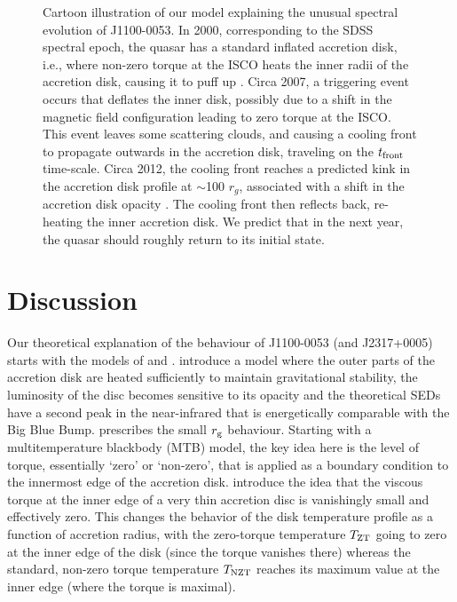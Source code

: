 \documentclass{nature}
\begin{document}
\begin{figure}
{    Cartoon illustration of our model explaining the unusual spectral evolution of J1100-0053. In 2000, corresponding to the SDSS spectral epoch, the quasar has a standard inflated accretion disk, i.e., where non-zero torque at the ISCO heats the inner radii of the accretion disk, causing it to puff up \citep[e.g.,][]{Zimmerman2005}. Circa 2007, a triggering event occurs that deflates the inner disk, possibly due to a shift in the magnetic field configuration leading to zero torque at the ISCO.  This event leaves some scattering clouds, and causing a cooling front to propagate outwards in the accretion disk, traveling on the $t_{\rm front}$ time-scale. Circa 2012, the cooling front reaches a predicted kink in the accretion disk profile at $\sim$100 $r_{g}$, associated with a shift in the accretion disk opacity \citep[e.g., Figure 2 of ][]{Sirko_Goodman2003}.  The cooling front then reflects back, re-heating the inner accretion disk. We predict that in the next year, the quasar should roughly return to its initial state.}
  \label{fig:J110057_diskmodel}
\end{figure}

\section{Discussion} 
Our theoretical explanation of the behaviour of J1100-0053 (and
J2317+0005) starts with the models of \cite{Sirko_Goodman2003} and
\cite{Zimmerman2005}. \cite{Sirko_Goodman2003} introduce a model where
the outer parts of the accretion disk are heated sufficiently to
maintain gravitational stability, the luminosity of the disc becomes
sensitive to its opacity and the theoretical SEDs have a second peak
in the near-infrared that is energetically comparable with the Big
Blue Bump. \cite{Zimmerman2005} prescribes the small $r_{\rm g}$
behaviour. Starting with a multitemperature blackbody (MTB) model, the
key idea here is the level of torque, essentially `zero' or
`non-zero', that is applied as a boundary condition to the innermost
edge of the accretion disk. \cite{Zimmerman2005} introduce the idea
that the viscous torque at the inner edge of a very thin accretion
disc is vanishingly small and effectively zero. This changes the
behavior of the disk temperature profile as a function of accretion
radius, with the zero-torque temperature $T_{\rm ZT}$ going to zero at
the inner edge of the disk (since the torque vanishes there) whereas
the standard, non-zero torque temperature $T_{\rm NZT}$ reaches its
maximum value at the inner edge (where the torque is maximal).
\end{document}
